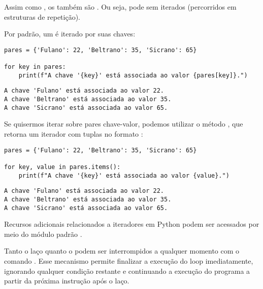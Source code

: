Assim como , os  também são .
Ou seja, pode sem iterados (percorridos em estruturas de repetição).

Por padrão, um  é iterado por suas chaves:
\begin{verbatim}
pares = {'Fulano': 22, 'Beltrano': 35, 'Sicrano': 65}

for key in pares:
    print(f"A chave '{key}' está associada ao valor {pares[key]}.")
\end{verbatim}
\begin{verbatim}
A chave 'Fulano' está associada ao valor 22.
A chave 'Beltrano' está associada ao valor 35.
A chave 'Sicrano' está associada ao valor 65.
\end{verbatim}

Se quisermos iterar sobre pares chave-valor, podemos utilizar o método , que retorna um iterador
com tuplas no formato :
\begin{verbatim}
pares = {'Fulano': 22, 'Beltrano': 35, 'Sicrano': 65}

for key, value in pares.items():
    print(f"A chave '{key}' está associada ao valor {value}.")
\end{verbatim}
\begin{verbatim}
A chave 'Fulano' está associada ao valor 22.
A chave 'Beltrano' está associada ao valor 35.
A chave 'Sicrano' está associada ao valor 65.
\end{verbatim}

Recursos adicionais relacionados a iteradores em Python podem ser acessados por meio do módulo padrão .

Tanto o laço  quanto o  podem ser interrompidos a qualquer momento com o
comando .
Esse mecanismo permite finalizar a execução do loop imediatamente, ignorando qualquer
condição restante e continuando a execução do programa a partir da próxima instrução após o laço.










